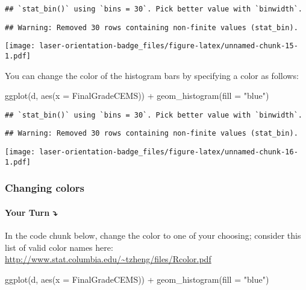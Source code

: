 \documentclass[
]{article}
\newenvironment{Shaded}{\begin{snugshade}}{\end{snugshade}}
\newcommand{\AttributeTok}[1]{\textcolor[rgb]{0.77,0.63,0.00}{#1}}
\newcommand{\FunctionTok}[1]{\textcolor[rgb]{0.00,0.00,0.00}{#1}}
\newcommand{\NormalTok}[1]{#1}
\newcommand{\SpecialCharTok}[1]{\textcolor[rgb]{0.00,0.00,0.00}{#1}}
\newcommand{\StringTok}[1]{\textcolor[rgb]{0.31,0.60,0.02}{#1}}
\begin{document}
\begin{verbatim}
## `stat_bin()` using `bins = 30`. Pick better value with `binwidth`.
\end{verbatim}

\begin{verbatim}
## Warning: Removed 30 rows containing non-finite values (stat_bin).
\end{verbatim}

\texttt{[image: laser-orientation-badge\_files/figure-latex/unnamed-chunk-15-1.pdf]}

You can change the color of the histogram bars by specifying a color as
follows:

\begin{Shaded}
\begin{Highlighting}[]
\FunctionTok{ggplot}\NormalTok{(d, }\FunctionTok{aes}\NormalTok{(}\AttributeTok{x =}\NormalTok{ FinalGradeCEMS)) }\SpecialCharTok{+}
  \FunctionTok{geom\_histogram}\NormalTok{(}\AttributeTok{fill =} \StringTok{"blue"}\NormalTok{)}
\end{Highlighting}
\end{Shaded}

\begin{verbatim}
## `stat_bin()` using `bins = 30`. Pick better value with `binwidth`.
\end{verbatim}

\begin{verbatim}
## Warning: Removed 30 rows containing non-finite values (stat_bin).
\end{verbatim}

\texttt{[image: laser-orientation-badge\_files/figure-latex/unnamed-chunk-16-1.pdf]}

\hypertarget{changing-colors}{%
\subsubsection{Changing colors}\label{changing-colors}}

\hypertarget{your-turn-5}{%
\paragraph{\texorpdfstring{{\textbf{Your Turn}}
\textbf{⤵}}{Your Turn ⤵}}\label{your-turn-5}}

In the code chunk below, change the color to one of your choosing;
consider this list of valid color names here:
\url{http://www.stat.columbia.edu/~tzheng/files/Rcolor.pdf}

\begin{Shaded}
\begin{Highlighting}[]
\FunctionTok{ggplot}\NormalTok{(d, }\FunctionTok{aes}\NormalTok{(}\AttributeTok{x =}\NormalTok{ FinalGradeCEMS)) }\SpecialCharTok{+}
  \FunctionTok{geom\_histogram}\NormalTok{(}\AttributeTok{fill =} \StringTok{"blue"}\NormalTok{)}
\end{Highlighting}
\end{Shaded}
\end{document}
